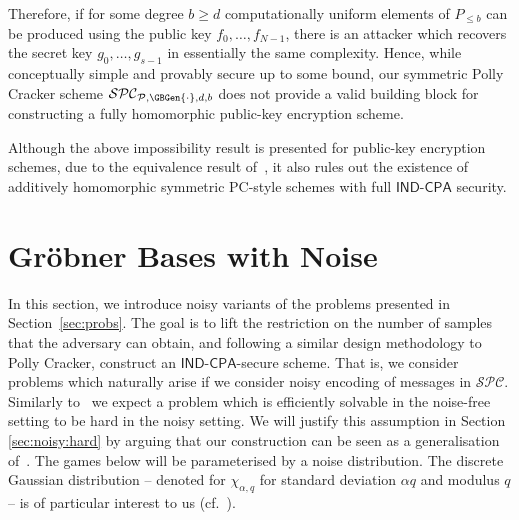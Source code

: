 \documentclass[draft]{llncs}
\newcommand{\heading}[1]{{\vspace{6pt}\noindent\sc{#1.}}}
\newcommand{\SPC}{\ensuremath{\mathcal{SPC}}\xspace}
\newcommand{\IND}{\mathsf{IND}}
\newcommand{\CPA}{\mathsf{CPA}}
\newcommand{\INDCPA}{\ensuremath{\IND\mbox{-}\CPA}\xspace}
\begin{document}
Therefore, if for some degree $b\geq d$ computationally uniform elements of $P_{\le b}$ can be produced using the public key $f_0,\dots,f_{N-1}$, there is an attacker which recovers the secret key $g_0,\dots,g_{s-1}$ in essentially the same complexity. Hence, while conceptually simple and provably secure up to some bound, our symmetric Polly Cracker scheme $\mathcal{SPC}_{\mathcal{P},\GBGen{\cdot},d,b}$ does not provide a valid building block for constructing a fully homomorphic public-key encryption scheme.

\heading{Remark} Although the above impossibility result is presented for public-key encryption schemes, due to the equivalence result of~\cite{Ro10}, it also rules out the existence of additively homomorphic symmetric PC-style schemes with full $\IND\mbox{-}\CPA$ security.

\vspace{-4mm} \section{Gröbner Bases with Noise} \vspace{-2mm} \label{sec:noisy}
In this section, we introduce noisy variants of the problems presented in Section~\ref{sec:probs}. The goal is to lift the restriction on the number of samples that the adversary can obtain, and following a similar design methodology to Polly Cracker, construct an \INDCPA-secure scheme. That is, we consider problems which naturally arise if we consider noisy encoding of messages in $\SPC$. Similarly to~\cite{DGHV10,lwesurvey} we expect a problem which is efficiently solvable in the noise-free setting to be hard in the noisy setting. We will justify this assumption in Section \ref{sec:noisy:hard} by arguing that our construction can be seen as a generalisation of~\cite{DGHV10,lwesurvey}. 
The games below will be parameterised by a noise distribution. The discrete Gaussian distribution -- denoted for $\chi_{\alpha,q}$ for standard deviation $\alpha q$ and modulus $q$ -- is of particular interest to us (cf.~\cite{regev:lwe}).
\end{document}
